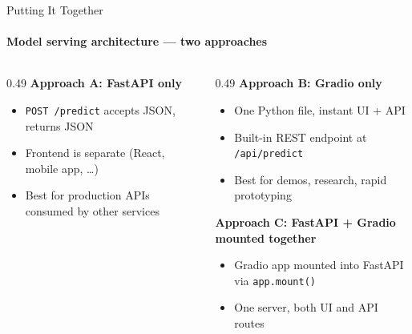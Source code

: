 \documentclass[aspectratio=169]{beamer}
\begin{document}
\begin{frame}[t]{Putting It Together}
\framesubtitle{Model serving architecture — two approaches}
\vspace{-0.2cm}
\begin{columns}[T,onlytextwidth]
    \begin{column}{0.49\textwidth}
        \textbf{Approach A: FastAPI only}
        \begin{itemize}
            \item \texttt{POST /predict} accepts JSON, returns JSON
            \item Frontend is separate (React, mobile app, \ldots)
            \item Best for production APIs consumed by other services
        \end{itemize}

    \end{column}
    \begin{column}{0.49\textwidth}
        \textbf{Approach B: Gradio only}
        \begin{itemize}
            \item One Python file, instant UI + API
            \item Built-in REST endpoint at \texttt{/api/predict}
            \item Best for demos, research, rapid prototyping
        \end{itemize}
        \textbf{Approach C: FastAPI + Gradio mounted together}
        \begin{itemize}
            \item Gradio app mounted into FastAPI via \texttt{app.mount()}
            \item One server, both UI and API routes
        \end{itemize}
    \end{column}
\end{columns}
\end{frame}
\end{document}
